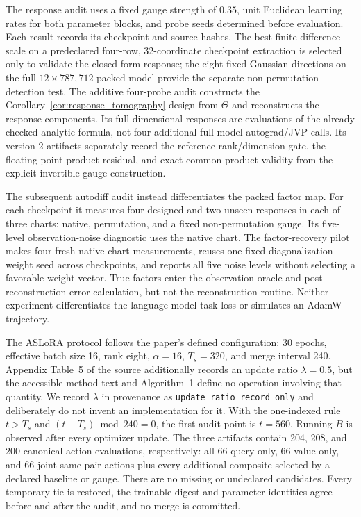 The response audit uses a fixed gauge strength of $0.35$, unit Euclidean
learning rates for both parameter blocks, and probe seeds determined before
evaluation.  Each result records its checkpoint and source hashes.  The best
finite-difference scale on a predeclared four-row, 32-coordinate checkpoint
extraction is selected only to validate the closed-form response; the eight
fixed Gaussian directions on the full $12\times787{,}712$ packed model provide
the separate non-permutation detection test.  The additive four-probe audit
constructs the Corollary~\ref{cor:response_tomography} design from \(\Theta\)
and reconstructs the response components.  Its full-dimensional responses are
evaluations of the already checked analytic formula, not four additional
full-model autograd/JVP calls.  Its version-2 artifacts separately record the
reference rank/dimension gate, the floating-point product residual, and exact
common-product validity from the explicit invertible-gauge construction.

The subsequent autodiff audit instead differentiates the packed factor map.
For each checkpoint it measures four designed and two unseen responses in
each of three charts: native, permutation, and a fixed non-permutation gauge.
Its five-level observation-noise diagnostic uses the native chart. The
factor-recovery pilot makes four fresh native-chart measurements, reuses one
fixed diagonalization weight seed across checkpoints, and reports all five
noise levels without selecting a favorable weight vector. True factors enter
the observation oracle and post-reconstruction error calculation, but not the
reconstruction routine. Neither experiment differentiates the language-model
task loss or simulates an AdamW trajectory.

The ASLoRA protocol follows the paper's defined configuration: 30 epochs,
effective batch size 16, rank eight, $\alpha=16$, $T_s=320$, and merge interval
240.  Appendix Table~5 of the source additionally records an update ratio
$\lambda=0.5$, but the accessible method text and Algorithm~1 define no
operation involving that quantity.  We record $\lambda$ in provenance as
\texttt{update\_ratio\_record\_only} and deliberately do not invent an
implementation for it.  With the one-indexed rule $t>T_s$ and
$(t-T_s)\bmod 240=0$, the first audit point is $t=560$.  Running $B$ is observed
after every optimizer update.  The three
artifacts contain 204, 208, and 200 canonical action evaluations, respectively:
all 66 query-only, 66 value-only, and 66 joint-same-pair actions plus every
additional composite selected by a declared baseline or gauge.  There are no
missing or undeclared candidates.  Every temporary tie is restored, the
trainable digest and parameter identities agree before and after the audit, and
no merge is committed.


